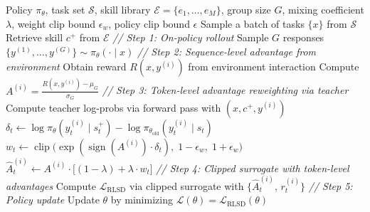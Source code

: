 \documentclass{llmxive}
\providecommand{\mycomment}[1]{\textit{// #1}}
\begin{document}
\begin{algorithm}[t]
  \caption{RLSD}
  \label{alg:rlsd}
  \begin{algorithmic}[1]
  \Require Policy $\pi_{\theta}$, task set $\mathcal{S}$, skill library $\mathcal{E} =
  \{e_1,\dots,e_M\}$, group size $G$, mixing coefficient $\lambda$, weight clip
  bound $\epsilon_w$, policy clip bound $\epsilon$
      \State Sample a batch of tasks $\{x\}$ from $\mathcal{S}$
          \State Retrieve skill $c^{+}$ from $\mathcal{E}$ 
          \State \mycomment{Step 1: On-policy rollout}
          \State Sample $G$ responses $\{y^{(1)},\dots,y^{(G)}\} \sim \pi_{\theta}(\cdot \mid
  x)$
          \State \mycomment{Step 2: Sequence-level advantage from environment}
              \State Obtain reward $R(x, y^{(i)})$ from environment interaction
          \EndFor
          \State Compute $A^{(i)} = \frac{R(x,y^{(i)}) - \mu_G}{\sigma_G}$
          \State \mycomment{Step 3: Token-level advantage reweighting via teacher}
              \State Compute teacher log-probs via forward pass with $(x, c^{+}, y^{(i)})$
                  \State $\delta_t \gets \log\pi_{\theta}(y_t^{(i)} \mid s_t^{+}) -
  \log\pi_{\theta_{\mathrm{old}}}(y_t^{(i)} \mid s_t)$
                  \State $w_t \gets \operatorname{clip}\!\bigl(\exp(\operatorname{sign}(A^{(i)})
  \cdot \delta_t),\;1{-}\epsilon_w,\;1{+}\epsilon_w\bigr)$
                  \State $\hat{A}_t^{(i)} \gets A^{(i)} \cdot
  \bigl[(1-\lambda) + \lambda \cdot w_t\bigr]$
              \EndFor
          \EndFor
          \State \mycomment{Step 4: Clipped surrogate with token-level advantages}
          \State Compute $\mathcal{L}_{\mathrm{RLSD}}$ via clipped surrogate with
  $\{\hat{A}_t^{(i)},\, r_t^{(i)}\}$
          \State \mycomment{Step 5: Policy update}
          \State Update $\theta$ by minimizing $\mathcal{L}(\theta) =
  \mathcal{L}_{\mathrm{RLSD}}(\theta)$
      \EndFor
  \EndFor
  \end{algorithmic}
\end{algorithm}
\end{document}
